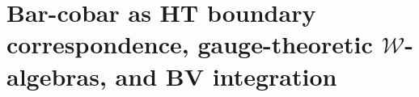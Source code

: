 
\providecommand{\fg}{\mathfrak{g}}
\providecommand{\fh}{\mathfrak{h}}
\providecommand{\fn}{\mathfrak{n}}
\providecommand{\fb}{\mathfrak{b}}
\providecommand{\cA}{\mathcal{A}}
\providecommand{\cO}{\mathcal{O}}
\providecommand{\cM}{\mathcal{M}}
\providecommand{\cL}{\mathcal{L}}
\providecommand{\cF}{\mathcal{F}}
\providecommand{\cH}{\mathcal{H}}
\providecommand{\cV}{\mathcal{V}}
\providecommand{\cC}{\mathcal{C}}
\providecommand{\cN}{\mathcal{N}}
\providecommand{\cW}{\mathcal{W}}
\providecommand{\cD}{\mathcal{D}}
\providecommand{\cE}{\mathcal{E}}
\providecommand{\cZ}{\mathcal{Z}}
\providecommand{\bC}{\mathbb{C}}
\providecommand{\bR}{\mathbb{R}}
\providecommand{\bZ}{\mathbb{Z}}
\providecommand{\bQ}{\mathbb{Q}}
\providecommand{\barB}{\bar{B}}
\providecommand{\barBch}{\bar{B}^{\mathrm{ch}}}
\providecommand{\Omegach}{\Omega^{\mathrm{ch}}}
\providecommand{\BBar}{\operatorname{Bar}}
\providecommand{\Cobar}{\operatorname{\Omega}}
\providecommand{\Tr}{\operatorname{Tr}}
\providecommand{\Res}{\operatorname{Res}}
\providecommand{\Sym}{\operatorname{Sym}}
\providecommand{\HH}{\operatorname{HH}}
\providecommand{\CE}{\operatorname{CE}}
\providecommand{\Hom}{\operatorname{Hom}}
\providecommand{\End}{\operatorname{End}}
\providecommand{\id}{\operatorname{id}}
\providecommand{\Spec}{\operatorname{Spec}}
\providecommand{\Obs}{\operatorname{Obs}}
\providecommand{\FM}{\operatorname{FM}}
\providecommand{\Conf}{\operatorname{Conf}}
\providecommand{\Ran}{\operatorname{Ran}}
\providecommand{\h}{\hbar}
\providecommand{\ov}[1]{\overline{#1}}
\providecommand{\Ainf}{\mathsf{A}_{\infty}}
\providecommand{\Linf}{\mathsf{L}_{\infty}}


\chapter{Bar-cobar as HT boundary correspondence, gauge-theoretic
\texorpdfstring{$\cW$}{W}-algebras, and BV integration}

